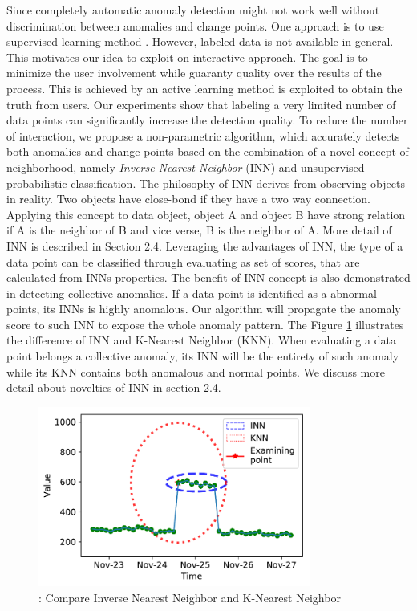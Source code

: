 \par Since completely automatic anomaly detection might not work well without discrimination between anomalies and change points. One approach is to use supervised learning method \cite{agrawal2015survey}\cite{gonbadi2015supervised}\cite{ma2016supervised}. However, labeled data is not available in general. This motivates our idea to exploit on interactive approach. The goal is to minimize the user involvement while guaranty quality over the results of the process. This is achieved by an  active learning method is exploited to obtain the truth from users. Our experiments show that labeling a very limited number of data points can significantly increase the detection quality. 
To reduce the number of interaction, we propose a non-parametric algorithm, which accurately detects both anomalies and change points based on the combination of a novel concept of neighborhood, namely {\em Inverse Nearest Neighbor} (INN) and unsupervised probabilistic classification. The philosophy of INN derives from observing objects in reality. Two objects have close-bond if they have a two way connection. Applying this concept to data object, object A and object B have strong relation if A is the neighbor of B and vice verse, B is the neighbor of A. More detail of INN is described in Section 2.4. Leveraging the advantages of INN, the type of a data point can be classified through evaluating as set of scores, that are calculated from INNs properties. The benefit of INN concept is also demonstrated in detecting collective anomalies. If a data point is identified as a abnormal points, its INNs is highly anomalous. Our algorithm will propagate the anomaly score to such INN to expose the whole anomaly pattern. The Figure \ref{fig: innvsknn} illustrates the difference of INN and K-Nearest Neighbor (KNN). When evaluating a data point belongs a collective anomaly, its INN will be the entirety of such anomaly while its KNN contains both anomalous and normal points. We discuss more detail about novelties of INN in section 2.4.\\

\begin{figure}[ht]
	\centering
	\includegraphics[width=0.8\textwidth]{Part3/Chapter7/figures/innvsknn.pdf}
	\caption{ : Compare Inverse Nearest Neighbor and K-Nearest Neighbor}
	\label{fig: innvsknn}
\end{figure}

